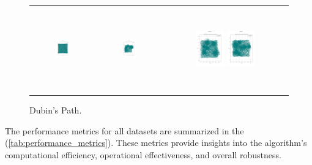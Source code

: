 \begin{figure}[p]
\begin{tabular}{ccc}
        \includegraphics[height=36mm,width=0.24\textwidth]{Images/simulation_no_obs/dubins_path/51.png}
        & \includegraphics[height=36mm,width=0.24\textwidth]{Images/simulation_no_obs/dubins_path/52.png}
        & \includegraphics[height=36mm,width=0.24\textwidth]{Images/simulation_no_obs/dubins_path/53.png}
        \includegraphics[height=36mm,width=0.24\textwidth]{Images/simulation_no_obs/dubins_path/54.png}\\[-4pt]

    \end{tabular}
    \caption{Dubin's Path.\label{fig:dubins_path}}
\end{figure}



\vspace{3mm}

The performance metrics for all datasets are summarized in the (\autoref{tab:performance_metrics}). These metrics provide insights into the algorithm's computational efficiency, operational effectiveness, and overall robustness.

